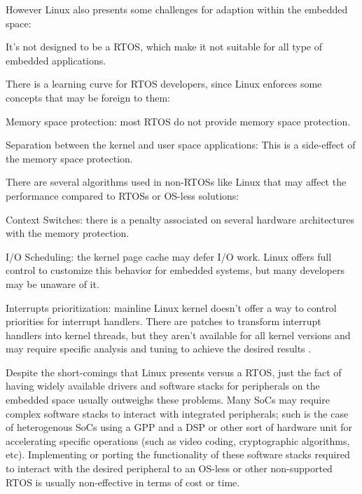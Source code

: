 However Linux also presents some challenges for adaption within the embedded space:
\begin{itemize*}
\item It's not designed to be a \ac{RTOS}, which make it not suitable for all type of embedded applications.
\item There is a learning curve for \ac{RTOS} developers, since Linux enforces some concepts that may be foreign to them:
	\begin{itemize*}
	\item Memory space protection: most \ac{RTOS} do not provide memory space protection.
	\item Separation between the kernel and user space applications: This is a side-effect of the memory space protection.
	\end{itemize*}
\item There are several algorithms used in non-\acp{RTOS} like Linux that may affect the performance compared to \acp{RTOS} or \ac{OS}-less solutions:
	\begin{itemize*}
	\item Context Switches: there is a penalty associated on several hardware architectures with the memory protection.
	\item I/O Scheduling: the kernel page cache may defer I/O work. Linux offers full control to customize this behavior for embedded systems, but many developers may be unaware of it.
	\item Interrupts prioritization: mainline Linux kernel doesn't offer a way to control priorities for interrupt handlers. There are patches to transform interrupt handlers into kernel threads, but they aren't available for all kernel versions and may require specific analysis and tuning to achieve the desired results \cite{Song_Chubb_10}.
	\end{itemize*}
\end{itemize*}

Despite the short-comings that Linux presents versus a \ac{RTOS}, just the fact of having widely available drivers and software stacks for peripherals on the embedded space usually outweighs these problems. Many \acp{SoC} may require complex software stacks to interact with integrated peripherals; such is the case of heterogenous \acp{SoC} using a \ac{GPP} and a \ac{DSP} or other sort of hardware unit for accelerating specific operations (such as video coding, cryptographic algorithms, etc). Implementing or porting the functionality of these software stacks required to interact with the desired peripheral to an \ac{OS}-less or other non-supported \ac{RTOS} is usually non-effective in terms of cost or time.

